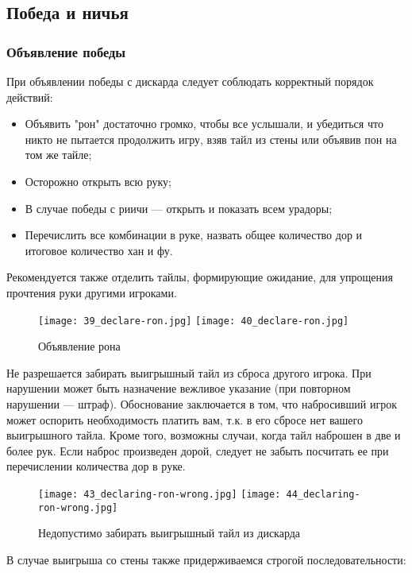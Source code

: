 \subsection{Победа и ничья}

\subsubsection{Объявление победы}

При объявлении победы с дискарда следует соблюдать корректный порядок действий:

\begin{itemize}
	\item Объявить "рон" достаточно громко, чтобы все услышали, и убедиться что никто не пытается продолжить игру, взяв тайл из стены или объявив пон на том же тайле;
	\item Осторожно открыть всю руку;
	\item В случае победы с риичи --- открыть и показать всем урадоры;
	\item Перечислить все комбинации в руке, назвать общее количество дор и итоговое количество хан и фу.
\end{itemize}

\newpage

Рекомендуется также отделить тайлы, формирующие ожидание, для упрощения прочтения руки другими игроками.

\begin{figure}[H]
	\centering
	\texttt{[image: 39\_declare-ron.jpg]}
	\texttt{[image: 40\_declare-ron.jpg]}
	\caption{Объявление рона}
\end{figure}

Не разрешается забирать выигрышный тайл из сброса другого игрока. При нарушении может быть назначение вежливое указание (при повторном нарушении --- штраф). Обоснование заключается в том, что набросивший игрок может оспорить необходимость платить вам, т.к. в его сбросе нет вашего выигрышного тайла. Кроме того, возможны случаи, когда тайл наброшен в две и более рук. Если наброс произведен дорой, следует не забыть посчитать ее при перечислении количества дор в руке.

\begin{figure}[H]
	\centering
	\texttt{[image: 43\_declaring-ron-wrong.jpg]}
	\texttt{[image: 44\_declaring-ron-wrong.jpg]}
	\caption{Недопустимо забирать выигрышный тайл из дискарда}
\end{figure}

В случае выигрыша со стены также придерживаемся строгой последовательности:

